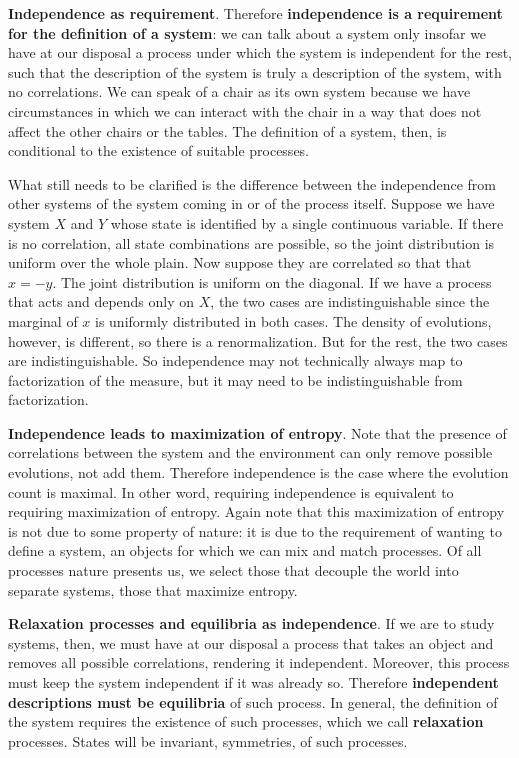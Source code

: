 \documentclass[10pt, onecolumn, longbibliography, nofootinbib]{revtex4-2}
\begin{document}
\textbf{Independence as requirement}. Therefore \textbf{independence is a requirement for the definition of a system}: we can talk about a system only insofar we have at our disposal a process under which the system is independent for the rest, such that the description of the system is truly a description of the system, with no correlations. We can speak of a chair as its own system because we have circumstances in which we can interact with the chair in a way that does not affect the other chairs or the tables. The definition of a system, then, is conditional to the existence of suitable processes.

What still needs to be clarified is the difference between the independence from other systems of the system coming in or of the process itself. Suppose we have system $X$ and $Y$ whose state is identified by a single continuous variable. If there is no correlation, all state combinations are possible, so the joint distribution is uniform over the whole plain. Now suppose they are correlated so that that $x=-y$. The joint distribution is uniform on the diagonal. If we have a process that acts and depends only on $X$, the two cases are indistinguishable since the marginal of $x$ is uniformly distributed in both cases. The density of evolutions, however, is different, so there is a renormalization. But for the rest, the two cases are indistinguishable. So independence may not technically always map to factorization of the measure, but it may need to be indistinguishable from factorization.

\textbf{Independence leads to maximization of entropy}. Note that the presence of correlations between the system and the environment can only remove possible evolutions, not add them. Therefore independence is the case where the evolution count is maximal. In other word, requiring independence is equivalent to requiring maximization of entropy. Again note that this maximization of entropy is not due to some property of nature: it is due to the requirement of wanting to define a system, an objects for which we can mix and match processes. Of all processes nature presents us, we select those that decouple the world into separate systems, those that maximize entropy.

\textbf{Relaxation processes and equilibria as independence}. If we are to study systems, then, we must have at our disposal a process that takes an object and removes all possible correlations, rendering it independent. Moreover, this process must keep the system independent if it was already so. Therefore \textbf{independent descriptions must be equilibria} of such process. In general, the definition of the system requires the existence of such processes, which we call \textbf{relaxation} processes. States will be invariant, symmetries, of such processes.
\end{document}
